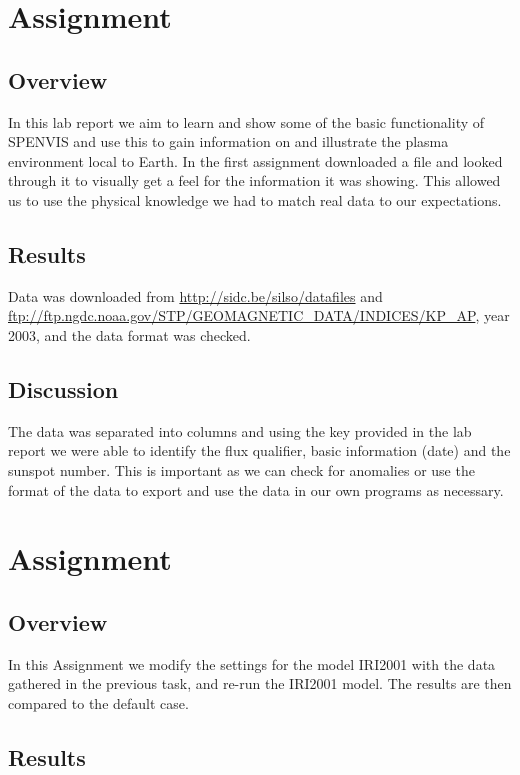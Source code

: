 \section{Assignment}
\subsection{Overview}
In this lab report we aim to learn and show some
 of the basic functionality of SPENVIS and use this to gain information on and illustrate the plasma environment local to Earth. In the first assignment downloaded a file and looked through it to visually get a feel for the information it was showing. This
 allowed us to use the physical knowledge we had to match real data to our expectations.
 
 
\subsection{Results}

Data was downloaded from \url{http://sidc.be/silso/datafiles} and \url{ftp://ftp.ngdc.noaa.gov/STP/GEOMAGNETIC_DATA/INDICES/KP_AP}, year 2003, and the data format was checked.


\subsection{Discussion}
The data was separated into columns and using the
 key provided in the lab report we were able to identify the flux qualifier, basic information (date) and the sunspot number. This is important as we can check for anomalies or use the format of the data to export and use the data in our own programs as necessary.



\section{Assignment}
\subsection{Overview}
In this Assignment we modify the settings for the model IRI2001 with the data gathered in the previous task, and re-run the IRI2001 model.
The results are then compared to the default case.
\subsection{Results}

